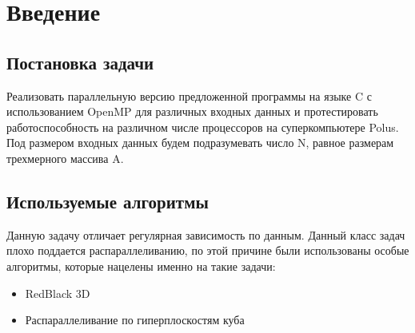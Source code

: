 \section{Введение}
\subsection{Постановка задачи}
Реализовать параллельную версию предложенной программы на языке C с использованием OpenMP для различных входных данных и протестировать работоспособность на различном числе процессоров на суперкомпьютере Polus. Под размером входных данных будем подразумевать число N, равное размерам трехмерного массива A.

\subsection{Используемые алгоритмы}
Данную задачу отличает регулярная зависимость по данным. Данный класс задач плохо поддается распараллеливанию, по этой причине были использованы особые алгоритмы, которые нацелены именно на такие задачи:
\begin{itemize}
    \item RedBlack 3D
    \item Распараллеливание по гиперплоскостям куба
\end{itemize}


